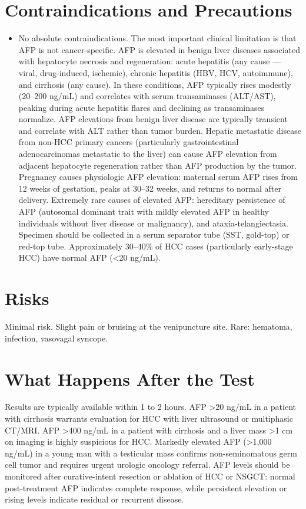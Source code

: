 \section*{Contraindications and Precautions}
\begin{itemize}
  \item No absolute contraindications. The most important clinical limitation is that AFP is not cancer-specific. AFP is elevated in benign liver diseases associated with hepatocyte necrosis and regeneration: acute hepatitis (any cause --- viral, drug-induced, ischemic), chronic hepatitis (HBV, HCV, autoimmune), and cirrhosis (any cause). In these conditions, AFP typically rises modestly (20--200 ng/mL) and correlates with serum transaminases (ALT/AST), peaking during acute hepatitis flares and declining as transaminases normalize. AFP elevations from benign liver disease are typically transient and correlate with ALT rather than tumor burden. Hepatic metastatic disease from non-HCC primary cancers (particularly gastrointestinal adenocarcinomas metastatic to the liver) can cause AFP elevation from adjacent hepatocyte regeneration rather than AFP production by the tumor. Pregnancy causes physiologic AFP elevation: maternal serum AFP rises from 12 weeks of gestation, peaks at 30--32 weeks, and returns to normal after delivery. Extremely rare causes of elevated AFP: hereditary persistence of AFP (autosomal dominant trait with mildly elevated AFP in healthy individuals without liver disease or malignancy), and ataxia-telangiectasia. Specimen should be collected in a serum separator tube (SST, gold-top) or red-top tube. Approximately 30--40\% of HCC cases (particularly early-stage HCC) have normal AFP (<20 ng/mL).
\end{itemize}
\section*{Risks}
Minimal risk. Slight pain or bruising at the venipuncture site. Rare: hematoma, infection, vasovagal syncope.

\section*{What Happens After the Test}
Results are typically available within 1 to 2 hours. AFP >20 ng/mL in a patient with cirrhosis warrants evaluation for HCC with liver ultrasound or multiphasic CT/MRI. AFP >400 ng/mL in a patient with cirrhosis and a liver mass >1 cm on imaging is highly suspicious for HCC. Markedly elevated AFP (>1,000 ng/mL) in a young man with a testicular mass confirms non-seminomatous germ cell tumor and requires urgent urologic oncology referral. AFP levels should be monitored after curative-intent resection or ablation of HCC or NSGCT: normal post-treatment AFP indicates complete response, while persistent elevation or rising levels indicate residual or recurrent disease.

